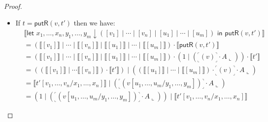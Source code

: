 \documentclass[twoside,11pt,final]{entics}
\newcommand{\putr}{\mathsf{putR}}
\newcommand{\corner}[1]{{\text{}^\ulcorner_\llcorner\!{#1}\!_\lrcorner^\urcorner}}
\newcommand{\asn}{\downarrow}
\newcommand{\seq}{,\!\ldots\!,}
\begin{document}
\begin{proof}
\begin{itemize}
\begin{align*}
      \\&= (((\llbracket [v_1^1] \rrbracket \mid \cdots \mid \llbracket [v_1^{k_1}] \rrbracket) \cdot \llbracket t_1 \rrbracket) \mid \cdots \mid ((\llbracket [v_m^1] \rrbracket \mid \cdots \mid \llbracket [v_m^{k_m}] \rrbracket) \cdot \llbracket t_m \rrbracket)) \cdot \llbracket r \rrbracket
      \\&= (\llbracket \textsf{let } x_1^1 \seq x_1^{k_1} \asn ([v_1^1] \mid \cdots \mid [v_1^{k_1}]) \textsf{ in } t_1 \rrbracket \mid \cdots \mid \llbracket \textsf{let } x_m^1 \seq x_m^{k_m} \asn ([v_m^1] \mid \cdots \mid [v_m^{k_m}]) \textsf{ in } t_m \rrbracket) \cdot \llbracket r \rrbracket
      \\&= (\llbracket t_1[v_1^1 \seq v_1^{k_1}/x_1^1 \seq x_1^{k_1}] \rrbracket \mid \cdots \mid \llbracket t_m[v_m^1 \seq v_m^{k_m} / x_m^1 \seq x_m^{k_m}] \rrbracket) \cdot \llbracket r \rrbracket
      \\&= \llbracket \textsf{let } y_1\seq y_m \asn (t_1[v_1^1 \seq v_1^{k_1}/x_1^1\seq x_1^{k_1}] \mid \cdots \mid t_m[v_m^1 \seq v_m^{k_m} / x_m^1 \seq x_m^{k_m}]) \textsf{ in } r \rrbracket
    \end{align*}
  \item If $t = \putr(v,t')$ then we have: 
    \begin{align*}
      & \llbracket \textsf{let } x_1 \seq x_n,y_1\seq y_m \asn ([v_1] \mid \cdots \mid [v_n] \mid [u_1] \mid \cdots \mid [u_m]) \textsf{ in } \putr(v,t')\rrbracket
      \\&= (\llbracket [v_1] \rrbracket \mid \cdots \mid \llbracket [v_n] \rrbracket \mid \llbracket [u_1] \rrbracket \mid \cdots \mid \llbracket [u_m] \rrbracket) \cdot \llbracket \putr(v,t') \rrbracket
      \\&= (\llbracket [v_1] \rrbracket \mid \cdots \mid \llbracket [v_n] \rrbracket \mid \llbracket [u_1] \rrbracket \mid \cdots \mid \llbracket [u_m] \rrbracket) \cdot (1 \mid (\corner{(v)} \cdot A\llcorner)) \cdot \llbracket t' \rrbracket
      \\&= ((\llbracket [v_1] \rrbracket \mid \cdots \llbracket [v_n] \rrbracket) \cdot \llbracket t' \rrbracket) \mid ((\llbracket [u_1] \rrbracket \mid \cdots \mid \llbracket [u_m] \rrbracket) \cdot \corner{(v)} \cdot A\llcorner)
      \\&= \llbracket t'[v_1 \seq v_n/x_1 \seq x_n] \rrbracket \mid (\corner{( v[u_1\seq u_m / y_1 \seq y_m] )} \cdot A\llcorner)
      \\&= (1 \mid (\corner{( v[u_1\seq u_m / y_1 \seq y_m] )} \cdot A\llcorner)) \mid \llbracket t'[v_1 \seq v_n / x_1 \seq x_n] \rrbracket 

\end{align*}
\end{itemize}
\end{proof}
\end{document}
